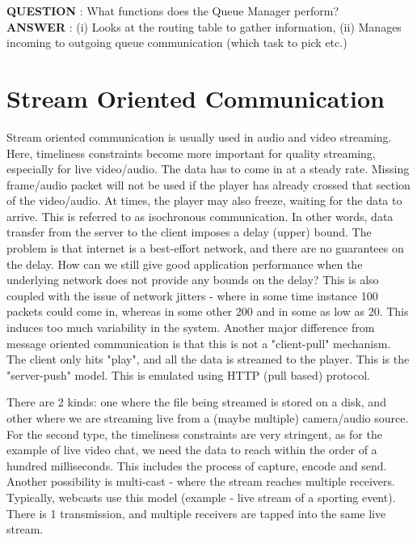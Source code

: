 \documentclass[twoside]{article}
\begin{document}
\textbf{QUESTION} : What functions does the Queue Manager perform?\\
\textbf{ANSWER} : (i) Looks at the routing table to gather information, (ii) Manages incoming to outgoing queue communication (which task to pick etc.)

\section{Stream Oriented Communication}
Stream oriented communication is usually used in audio and video streaming. Here, timeliness constraints become more important for quality streaming, especially for live video/audio. The data has to come in at a steady rate. Missing frame/audio packet will not be used if the player has already crossed that section of the video/audio. At times, the player may also freeze, waiting for the data to arrive. This is referred to as isochronous communication. In other words, data transfer from the server to the client imposes a delay (upper) bound. The problem is that internet is a best-effort network, and there are no guarantees on the delay. How can we still give good application performance when the underlying network does not provide any bounds on the delay? This is also coupled with the issue of network jitters - where in some time instance 100 packets could come in, whereas in some other 200 and in some as low as 20. This induces too much variability in the system. Another major difference from message oriented communication is that this is not a "client-pull" mechanism. The client only hits "play", and all the data is streamed to the player. This is the "server-push" model. This is emulated using HTTP (pull based) protocol.

There are 2 kinds: one where the file being streamed is stored on a disk, and other where we are streaming live from a (maybe multiple) camera/audio source. For the second type, the timeliness constraints are very stringent, as for the example of live video chat, we need the data to reach within the order of a hundred milliseconds. This includes the process of capture, encode and send. Another possibility is multi-cast - where the stream reaches multiple receivers. Typically, webcasts use this model (example - live stream of a sporting event). There is 1 transmission, and multiple receivers are tapped into the same live stream. 
\end{document}

